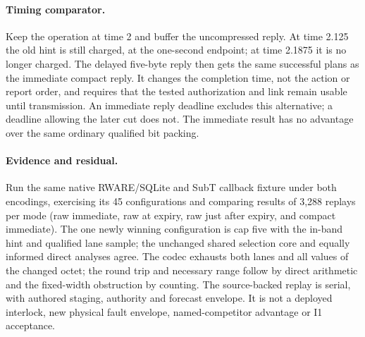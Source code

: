 \documentclass{article}
\begin{document}
\paragraph{Timing comparator.} Keep the operation at time 2 and buffer the
uncompressed reply. At time 2.125 the old hint is still charged, at the
one-second endpoint; at time 2.1875 it is no longer charged. The delayed
five-byte reply then gets the same successful plans as the immediate
compact reply. It changes the completion time, not the action or report
order, and requires that the tested authorization and link remain usable
until transmission. An immediate reply deadline excludes this alternative;
a deadline allowing the later cut does not. The immediate result has
no advantage over the same ordinary qualified bit packing.
\paragraph{Evidence and residual.} Run the same native RWARE/SQLite and
SubT callback fixture under both encodings, exercising its 45 configurations
and comparing results of 3,288 replays per mode (raw immediate, raw at expiry, raw just after expiry, and compact immediate). The one newly winning
configuration is cap five with the in-band hint and qualified lane sample;
the unchanged shared selection core and equally informed direct analyses
agree. The codec exhausts both lanes and all values of the changed octet;
the round trip and necessary range follow by direct arithmetic and the fixed-width obstruction by counting. The
source-backed replay is serial, with authored staging, authority and
forecast envelope. It is not a deployed interlock, new physical fault
envelope, named-competitor advantage or I1 acceptance.
\end{document}
